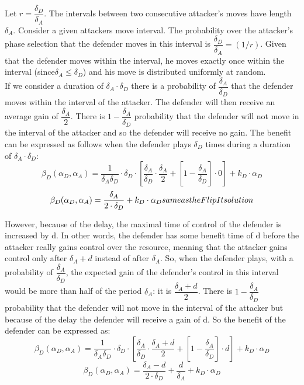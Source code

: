 Let $r = \dfrac{\delta_{D}}{ \delta_{A} }$. The intervals between two consecutive attacker's moves have length $\delta_{A}$. Consider a given attackers move interval. The probability over the attacker's phase selection that the defender moves in this interval is $\dfrac{\delta_{D}}{ \delta_{A} } = (1/r)$. Given that the defender moves within the interval, he moves exactly once within the interval (since$\delta_{A} \leq \delta_{D} $) and his move is distributed uniformly at random. \\

If we consider a duration of $\delta_{A} \cdot \delta_{D} $ there is a probability of $\dfrac{\delta_{A} } {\delta_{D}} $ that the defender moves within the interval of the attacker. The defender will then receive an average gain of $\dfrac{\delta_{A}} {2} $. There is $1- \dfrac{\delta_{A} } {\delta_{D}} $ probability that the defender will not move in the interval of the attacker and so the defender will receive no gain. The benefit can be expressed as follows when the  defender plays $\delta_{D}$ times during a duration of $\delta_{A} \cdot \delta_{D}$:
\begin{equation}\label{first}
\beta_{D}(\alpha_{D},\alpha_{A}) = \dfrac { 1} {\delta_{A} \delta_{D}} \cdot \delta_{D} \cdot [ \dfrac{\delta_{A}}{\delta_{D}} \cdot \dfrac{\delta_{A}}{2}+[ 1-\dfrac{\delta_{A}}{ \delta_{D}}] \cdot 0 ] + k_{D} \cdot \alpha_{D}
\end{equation}
\begin{equation}\label{first}
\beta_{D}(\alpha_{D},\alpha_{A}) = \dfrac {\delta_{A} }{2 \cdot \delta_{D}} + k_{D} \cdot \alpha_{D} $$same as the FlipIt solution$$
\end{equation}

However, because of the delay, the maximal time of control of the defender is increased by d. In other words, the defender has some benefit time of d before the attacker really gains control over the resource, meaning that the attacker gains control only after $\delta_{A}+d$ instead of after $\delta_{A}$. So, when the defender plays, with a probability of $\dfrac{\delta_{A} } {\delta_{D}} $, the expected gain of the defender's control in this interval would be more than half of the period $\delta_{A} $: it is $\dfrac{\delta_{A} + d}{2}$. There is $1- \dfrac{\delta_{A} } {\delta_{D}} $ probability that the defender will not move in the interval of the attacker but because of the delay the defender will receive a gain of d. So the benefit of the defender can be expressed as:
\begin{equation}\label{first}
\beta_{D}(\alpha_{D},\alpha_{A}) = \dfrac { 1} {\delta_{A} \delta_{D}} \cdot \delta_{D} \cdot [ \dfrac{\delta_{A} }{\delta_{D}} \cdot \dfrac{\delta_{A} + d}{2}+[ 1-\dfrac{\delta_{A}}{ \delta_{D}}] \cdot d ] + k_{D} \cdot \alpha_{D}
\end{equation}
\begin{equation}\label{first}
\beta_{D}(\alpha_{D},\alpha_{A}) = \dfrac {\delta_{A} - d}{2 \cdot \delta_{D}} + \dfrac{d}{\delta_{A}}  + k_{D} \cdot \alpha_{D}
\end{equation}

